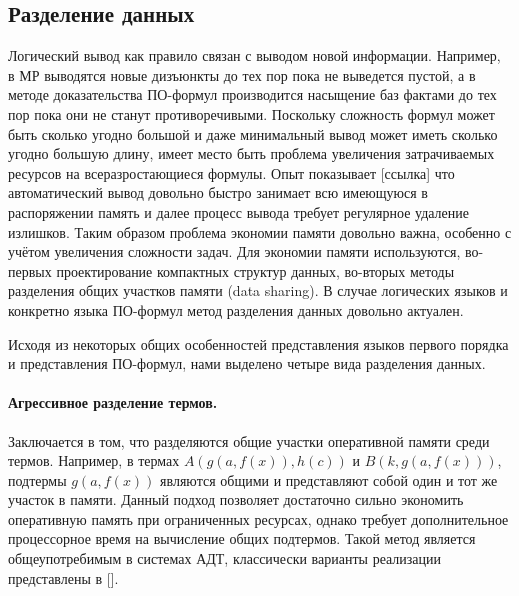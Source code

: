 \subsection{Разделение данных}
Логический вывод как правило связан с выводом новой информации. Например, в МР выводятся новые дизъюнкты до тех пор пока не выведется пустой, а в методе доказательства ПО-формул производится насыщение баз фактами до тех пор пока они не станут противоречивыми. Поскольку сложность формул может быть сколько угодно большой и даже минимальный вывод может иметь сколько угодно большую длину, имеет место быть проблема увеличения затрачиваемых ресурсов на всеразростающиеся формулы. Опыт показывает [ссылка] что автоматический вывод довольно быстро занимает всю имеющуюся в распоряжении память и далее процесс вывода требует регулярное удаление излишков. Таким образом проблема экономии памяти  довольно важна, особенно с учётом увеличения сложности задач. Для экономии памяти используются, во-первых проектирование компактных структур данных, во-вторых методы разделения общих участков памяти (data sharing). В случае логических языков и конкретно языка ПО-формул метод разделения данных довольно актуален.

Исходя из некоторых общих особенностей представления языков первого порядка и представления ПО-формул, нами выделено четыре вида разделения данных.

\paragraph{Агрессивное разделение термов.} Заключается в том, что разделяются общие участки оперативной памяти среди термов. Например, в термах $A(g(a,f(x)),h(c))$ и $B(k,g(a,f(x)))$, подтермы $g(a,f(x))$ являются общими и представляют собой один и тот же участок в памяти. Данный подход позволяет достаточно сильно экономить оперативную память при ограниченных ресурсах, однако требует дополнительное процессорное время на вычисление общих подтермов. Такой метод является общеупотребимым в системах АДТ, классически варианты реализации представлены в []. 

